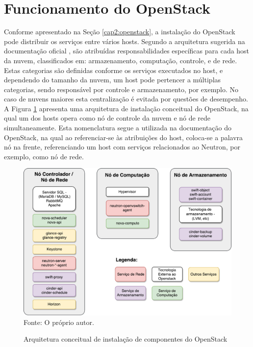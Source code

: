 \section{Funcionamento do OpenStack}
\label{cap3:openstack_detalhes}

Conforme apresentado na Seção \ref{cap2:openstack}, a instalação do OpenStack pode distribuir os serviços entre vários hosts. 
%
Segundo a arquitetura sugerida na documentação oficial \cite{openstack:newton}, são atribuídas responsabilidades específicas para cada host da nuvem, classificados em: armazenamento, computação, controle, e de rede.
%
Estas categorias são definidas conforme os serviços executados no host, e dependendo do tamanho da nuvem, um host pode pertencer a múltiplas categorias, sendo responsável por controle e armazenamento, por exemplo.
%
No caso de nuvens maiores esta centralização é evitada por questões de desempenho.
%
A Figura \ref{fig:openstack_instalacao_servicos} apresenta uma arquitetura de instalação conceitual do OpenStack, na qual um dos hosts opera como nó de controle da nuvem e nó de rede simultaneamente.
%
Esta nomenclatura segue a utilizada na documentação do OpenStack, na qual ao referenciar-se às atribuições do host, coloca-se a palavra nó na frente, referenciando um host com serviços relacionados ao Neutron, por exemplo, como nó de rede.

\vspace{-0.3cm}
\begin{figure}[!htb]
	\centering
	\caption{Arquitetura conceitual de instalação de componentes do OpenStack}
    \vspace{-0.3cm}
	\includegraphics[width=.75\textwidth]{img/openstack_arquitetura_instalacao.pdf}
	\label{fig:openstack_instalacao_servicos}\\
    \vspace{-0.3cm}
	Fonte: O próprio autor.
\end{figure}

